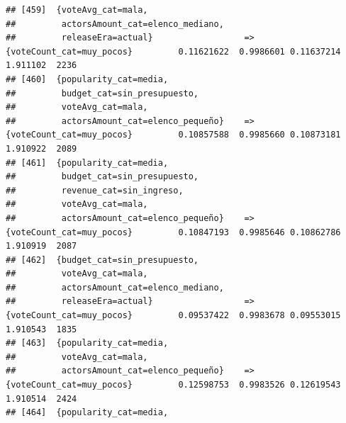 \documentclass[
]{article}
\begin{document}
\begin{verbatim}
## [459]  {voteAvg_cat=mala,                                                                                                       
##         actorsAmount_cat=elenco_mediano,                                                                                        
##         releaseEra=actual}                  => {voteCount_cat=muy_pocos}         0.11621622  0.9986601 0.11637214 1.911102  2236
## [460]  {popularity_cat=media,                                                                                                   
##         budget_cat=sin_presupuesto,                                                                                             
##         voteAvg_cat=mala,                                                                                                       
##         actorsAmount_cat=elenco_pequeño}    => {voteCount_cat=muy_pocos}         0.10857588  0.9985660 0.10873181 1.910922  2089
## [461]  {popularity_cat=media,                                                                                                   
##         budget_cat=sin_presupuesto,                                                                                             
##         revenue_cat=sin_ingreso,                                                                                                
##         voteAvg_cat=mala,                                                                                                       
##         actorsAmount_cat=elenco_pequeño}    => {voteCount_cat=muy_pocos}         0.10847193  0.9985646 0.10862786 1.910919  2087
## [462]  {budget_cat=sin_presupuesto,                                                                                             
##         voteAvg_cat=mala,                                                                                                       
##         actorsAmount_cat=elenco_mediano,                                                                                        
##         releaseEra=actual}                  => {voteCount_cat=muy_pocos}         0.09537422  0.9983678 0.09553015 1.910543  1835
## [463]  {popularity_cat=media,                                                                                                   
##         voteAvg_cat=mala,                                                                                                       
##         actorsAmount_cat=elenco_pequeño}    => {voteCount_cat=muy_pocos}         0.12598753  0.9983526 0.12619543 1.910514  2424
## [464]  {popularity_cat=media,                                                                                                   

\end{verbatim}
\end{document}
